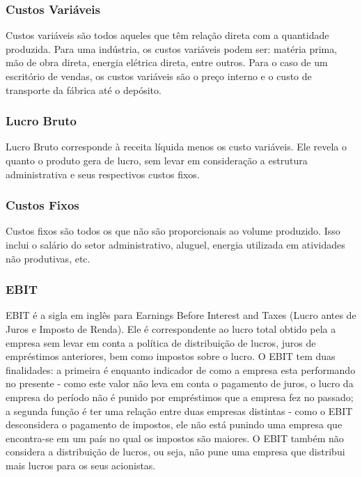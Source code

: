 \documentclass[12pt]{article}
\begin{document}
\subsubsection{Custos Variáveis}

	Custos variáveis são todos aqueles que têm relação direta com a quantidade produzida. Para uma indústria, os custos variáveis podem ser: matéria prima, mão de obra direta, energia elétrica direta, entre outros. Para o caso de um escritório de vendas, os custos variáveis são o preço interno e o custo de transporte da fábrica até o depósito.

\subsubsection{Lucro Bruto}

	Lucro Bruto corresponde à receita líquida menos os custo variáveis. Ele revela o quanto o produto gera de lucro, sem levar em consideração a estrutura administrativa e seus respectivos custos fixos.

\subsubsection{Custos Fixos}

	Custos fixos são todos os que não são proporcionais ao volume produzido. Isso inclui o salário do setor administrativo, aluguel, energia utilizada em atividades não produtivas, etc.

\subsubsection{EBIT}

	EBIT é a sigla em inglês para Earnings Before Interest and Taxes (Lucro antes de Juros e Imposto de Renda). Ele é correspondente ao lucro total obtido pela a empresa sem levar em conta a política de distribuição de lucros, juros de empréstimos anteriores, bem como impostos sobre o lucro. O EBIT tem duas finalidades: a primeira é enquanto indicador de como a empresa esta performando no presente - como este valor não leva em conta o pagamento de juros, o lucro da empresa do período não é punido por empréstimos que a empresa fez no passado; a segunda função é ter uma relação entre duas empresas distintas - como o EBIT desconsidera o pagamento de impostos, ele não está punindo uma empresa que encontra-se em um país no qual os impostos são maiores. O EBIT também não considera a distribuição de lucros, ou seja, não pune uma empresa que distribui mais lucros para os seus acionistas.
\end{document}
